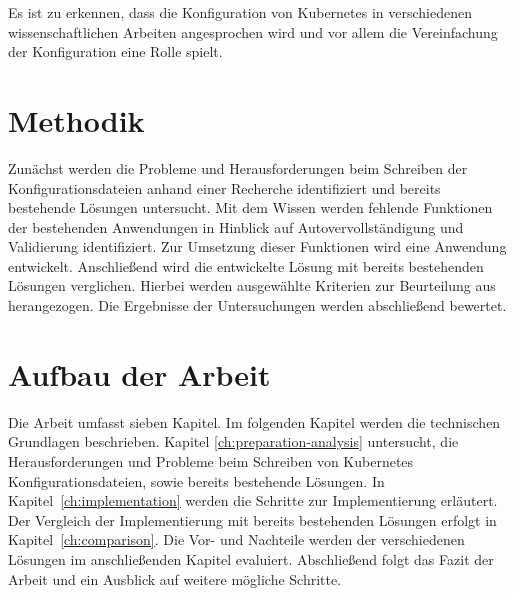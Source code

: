Es ist zu erkennen, dass die Konfiguration von Kubernetes in verschiedenen wissenschaftlichen Arbeiten angesprochen wird und vor allem die Vereinfachung
der Konfiguration eine Rolle spielt.

\section{Methodik}
Zunächst werden die Probleme und Herausforderungen beim Schreiben der Konfigurationsdateien anhand einer Recherche identifiziert und
bereits bestehende Lösungen untersucht. Mit dem Wissen werden fehlende Funktionen der bestehenden Anwendungen in Hinblick auf Autovervollständigung und Validierung identifiziert.
Zur Umsetzung dieser Funktionen wird eine Anwendung entwickelt.
Anschließend wird die entwickelte Lösung mit bereits bestehenden Lösungen verglichen.
Hierbei werden ausgewählte Kriterien zur Beurteilung aus~\cite[A Large-Scale Study of Usability Criteria Addressed by Static Analysis Tools]{usability-criteria-static-analysis-tools} herangezogen.
Die Ergebnisse der Untersuchungen werden abschließend bewertet.

\section{Aufbau der Arbeit}
Die Arbeit umfasst sieben Kapitel.
Im folgenden Kapitel werden die technischen Grundlagen beschrieben.
Kapitel \ref{ch:preparation-analysis} untersucht, die Herausforderungen und Probleme beim Schreiben von Kubernetes Konfigurationsdateien, sowie bereits bestehende Lösungen.
In Kapitel~\ref{ch:implementation} werden die Schritte zur Implementierung erläutert.
Der Vergleich der Implementierung mit bereits bestehenden Lösungen erfolgt in Kapitel~\ref{ch:comparison}.
Die Vor- und Nachteile werden der verschiedenen Lösungen im anschließenden Kapitel evaluiert.
Abschließend folgt das Fazit der Arbeit und ein Ausblick auf weitere mögliche Schritte.
